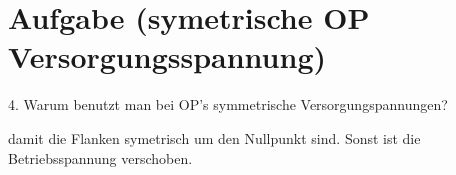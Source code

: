 \section{Aufgabe (symetrische OP Versorgungsspannung)}%
\label{sec:aufgabe_4}

4. Warum benutzt man bei OP's symmetrische Versorgungspannungen?

damit die Flanken symetrisch um den Nullpunkt sind. Sonst ist die
Betriebsspannung verschoben.
